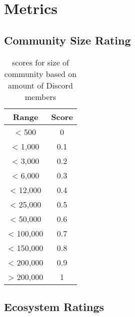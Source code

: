 \chapter{Metrics}

\section{Community Size Rating}

\normalsize

\begin{table}[H]
    \centering
    \begin{tabular}{|c|c|}
        \hline
        \textbf{Range} & \textbf{Score} \\
        \hline
        < 500          & 0              \\ \hline
        < 1,000        & 0.1            \\ \hline
        < 3,000        & 0.2            \\ \hline
        < 6,000        & 0.3            \\ \hline
        < 12,000       & 0.4            \\ \hline
        < 25,000       & 0.5            \\ \hline
        < 50,000       & 0.6            \\ \hline
        < 100,000      & 0.7            \\ \hline
        < 150,000      & 0.8            \\ \hline
        < 200,000      & 0.9            \\ \hline
        > 200,000      & 1              \\ \hline
    \end{tabular}
    \caption{scores for size of community based on amount of Discord members}
    \label{tab:metrics:community}
\end{table}

\section{Ecosystem Ratings}

